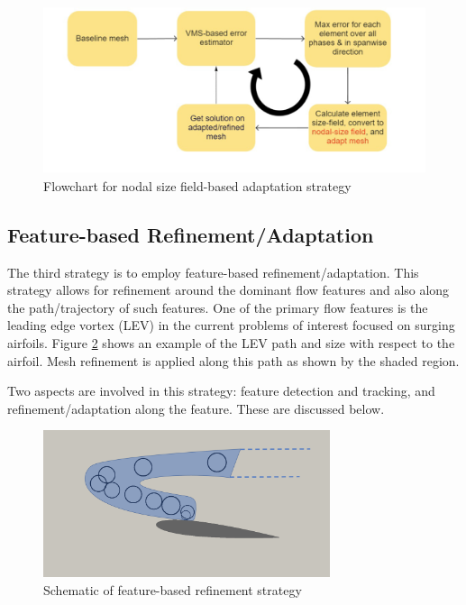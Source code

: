 \begin{figure}[H]
	\centering
	\includegraphics[width=1\textwidth]{figures/adapt_strat/size_based.png}
	\caption{Flowchart for nodal size field-based adaptation strategy}
	\label{fig:size_based_strat}
\end{figure}

\subsection{Feature-based Refinement/Adaptation}

The third strategy is to employ feature-based refinement/adaptation. 
This strategy allows for refinement around the dominant flow features and also along the path/trajectory of such features.
One of the primary flow features is the leading edge vortex (LEV) in the current problems of interest focused on surging airfoils. 
Figure \ref{fig:feature_based_strat_schematic} shows an example of the LEV path and size with respect to the airfoil. 
Mesh refinement is applied along this path as shown by the shaded region.


Two aspects are involved in this strategy: feature detection and tracking, and refinement/adaptation along the feature. These are discussed below.


	
\begin{figure}[H]
	\centering
	\includegraphics[width=0.75\textwidth]{figures/adapt_strat/feature_based_schematic.png}
	\caption{Schematic of feature-based refinement strategy}
	\label{fig:feature_based_strat_schematic}
\end{figure}

